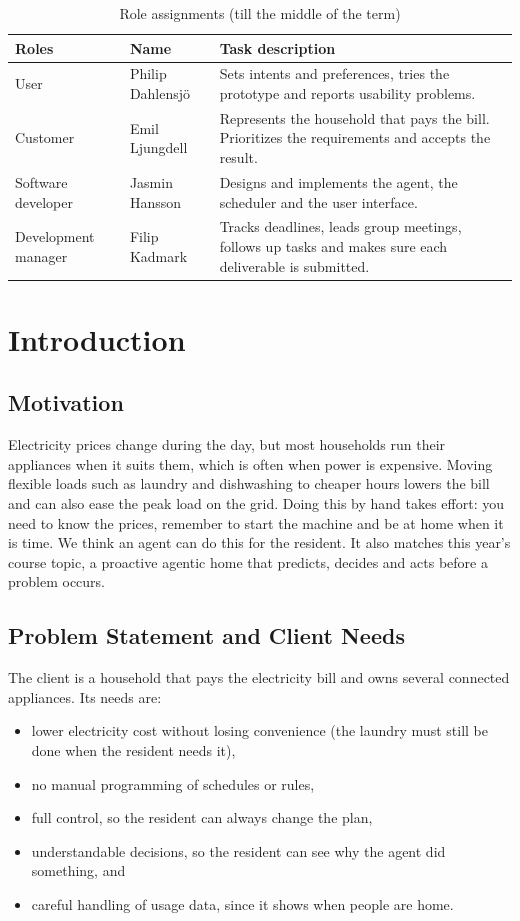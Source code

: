 \documentclass[conference,a4paper]{IEEEtran}
\begin{document}
\begin{table}[t]
\caption{Role assignments (till the middle of the term)}
\label{tab:roles}
\centering
\footnotesize
\setlength{\tabcolsep}{3pt}
\begin{tabular}{@{}p{}p{}p{}@{}}
\toprule
\textbf{Roles} & \textbf{Name} & \textbf{Task description}\\
\midrule
User & Philip Dahlensj\"o & Sets intents and preferences, tries the prototype and reports usability problems.\\
Customer & Emil Ljungdell & Represents the household that pays the bill. Prioritizes the requirements and accepts the result.\\
Software developer & Jasmin Hansson & Designs and implements the agent, the scheduler and the user interface.\\
Development manager & Filip Kadmark & Tracks deadlines, leads group meetings, follows up tasks and makes sure each deliverable is submitted.\\
\bottomrule
\end{tabular}
\end{table}

\section{Introduction}

\subsection{Motivation}
Electricity prices change during the day, but most households run their appliances when it suits them, which is often when power is expensive. Moving flexible loads such as laundry and dishwashing to cheaper hours lowers the bill and can also ease the peak load on the grid. Doing this by hand takes effort: you need to know the prices, remember to start the machine and be at home when it is time. We think an agent can do this for the resident. It also matches this year's course topic, a proactive agentic home that predicts, decides and acts before a problem occurs.

\subsection{Problem Statement and Client Needs}
The client is a household that pays the electricity bill and owns several connected appliances. Its needs are:
\begin{itemize}
\item lower electricity cost without losing convenience (the laundry must still be done when the resident needs it),
\item no manual programming of schedules or rules,
\item full control, so the resident can always change the plan,
\item understandable decisions, so the resident can see why the agent did something, and
\item careful handling of usage data, since it shows when people are home.
\end{itemize}
\end{document}

